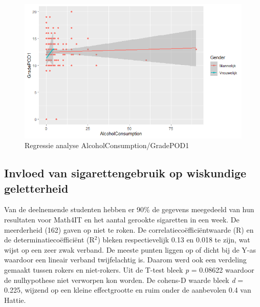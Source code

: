 \documentclass{hogent-article}
\begin{document}
\begin{figure}[ht]
    \begin{center}
        \includegraphics[width=\columnwidth]{AlcPOD.png}
    \end{center}
    \caption{Regressie analyse AlcoholConsumption/GradePOD1}
    \label{Regressie analyse AlcoholConsumption/GradePOD1}
\end{figure}

\subsection{Invloed van sigarettengebruik op wiskundige geletterheid}
Van de deelnemende studenten hebben er 90\% de gegevens meegedeeld van hun resultaten voor Math4IT en het aantal gerookte sigaretten in een week. De meerderheid (162) gaven op niet te roken. De correlatiecoëfficiëntwaarde (R) en de determinatiecoëfficiënt (R$^{2}$) bleken respectievelijk 0.13 en 0.018 te zijn, wat wijst op een zeer zwak verband. De meeste punten liggen op of dicht bij de Y-as waardoor een lineair verband twijfelachtig is. Daarom werd ook een verdeling gemaakt tussen rokers en niet-rokers. Uit de T-test bleek \textit{p} = 0.08622 waardoor de nulhypothese niet verworpen kon worden. De cohens-D waarde bleek \textit{d} = 0.225, wijzend op een kleine effectgrootte en ruim onder de aanbevolen 0.4 van Hattie.
\end{document}
